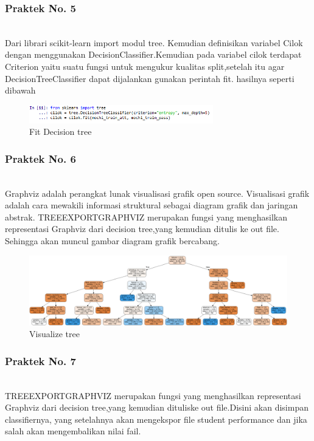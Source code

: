 \subsubsection{Praktek No. 5}
\hfill\\

Dari librari scikit-learn import modul tree. Kemudian deﬁnisikan variabel Cilok dengan menggunakan DecisionClassiﬁer.Kemudian pada variabel cilok terdapat Criterion yaitu suatu fungsi untuk mengukur kualitas split,setelah itu agar DecisionTreeClassiﬁer dapat dijalankan gunakan perintah ﬁt. hasilnya seperti dibawah

\begin{figure}[H]
    \includegraphics[width=8cm]{figures/1174083/figures2/p5.png}
    \centering
    \caption{Fit Decision tree}
\end{figure}

\subsubsection{Praktek No. 6}
\hfill\\

Graphviz adalah perangkat lunak visualisasi graﬁk open source. Visualisasi graﬁk adalah cara mewakili informasi struktural sebagai diagram graﬁk dan jaringan abstrak. TREEEXPORTGRAPHVIZ merupakan fungsi yang menghasilkan representasi Graphviz dari decision tree,yang kemudian ditulis ke out ﬁle. Sehingga akan muncul gambar diagram graﬁk bercabang.

\begin{figure}[H]
    \includegraphics[width=12cm]{figures/1174083/figures2/p6.png}
    \centering
    \caption{Visualize tree}
\end{figure}

\subsubsection{Praktek No. 7}
\hfill\\

TREEEXPORTGRAPHVIZ merupakan fungsi yang menghasilkan representasi  Graphviz dari decision tree,yang kemudian dituliske out ﬁle.Disini akan disimpan classiﬁernya, yang setelahnya akan mengekspor ﬁle student performance dan jika salah akan mengembalikan nilai fail.

